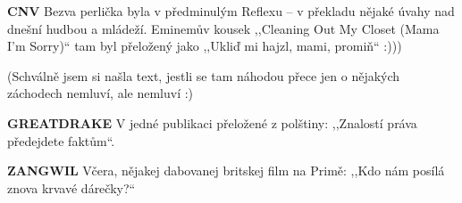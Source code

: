 \medskip

\noindent
\textbf{CNV} Bezva perlička byla v předminulým Reflexu -- v překladu nějaké úvahy nad dnešní hudbou a mládeží. Eminemův kousek ,,Cleaning Out My Closet (Mama I'm Sorry)`` tam byl přeložený jako ,,Ukliď mi hajzl, mami, promiň`` :))) 

\noindent
(Schválně jsem si našla text, jestli se tam náhodou přece jen o nějakých záchodech nemluví, ale nemluví :)

\medskip

\noindent
\textbf{GREATDRAKE} V jedné publikaci přeložené z polštiny: ,,Znalostí práva předejdete faktům``.

\medskip

\noindent
\textbf{ZANGWIL} Včera, nějakej dabovanej britskej film na Primě: ,,Kdo nám posílá znova krvavé dárečky?``

